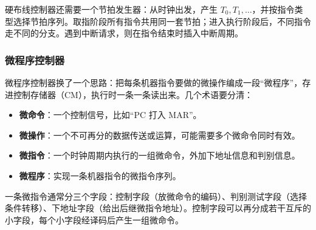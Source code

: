 硬布线控制器还需要一个节拍发生器：从时钟出发，产生 $T_0,T_1,\dots$，并按指令类型选择节拍序列。取指阶段所有指令共用同一套节拍；进入执行阶段后，不同指令走不同的分支。遇到中断请求，则在指令结束时插入中断周期。

\subsubsection{微程序控制器}

微程序控制器换了一个思路：把每条机器指令要做的微操作编成一段“微程序”，存进控制存储器（CM），执行时一条一条读出来。几个术语要分清：

\begin{itemize}
  \item \textbf{微命令}：一个控制信号，比如“PC 打入 MAR”。
  \item \textbf{微操作}：一个不可再分的数据传送或运算，可能需要多个微命令同时有效。
  \item \textbf{微指令}：一个时钟周期内执行的一组微命令，外加下地址信息和判别信息。
  \item \textbf{微程序}：实现一条机器指令的微指令序列。
\end{itemize}

一条微指令通常分三个字段：控制字段（放微命令的编码）、判别测试字段（选择条件转移）、下地址字段（给出后继微指令地址）。控制字段可以再分成若干互斥的小字段，每个小字段经译码后产生一组微命令。

